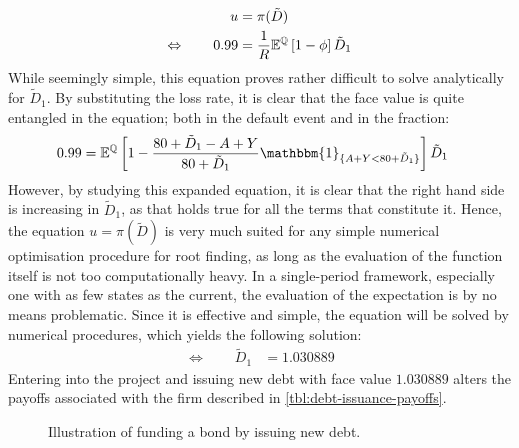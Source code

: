 \documentclass[main.tex]{subfiles}
\begin{document}
            \begin{align*}
                u &= \pi(\tilde{D}) \\
                \Leftrightarrow  \qquad
                \num{0.99} 
                &= 
                    \frac{1}{R}
                    \mathbb{E}^{\mathbb{Q}}\left[
                        1 - \phi
                    \right] 
                    \tilde{D}_{1}
            \end{align*}
        While seemingly simple, this equation proves rather difficult to solve analytically for $\tilde{D}_{1}$.
        By substituting the loss rate, it is clear that the face value is quite entangled in the equation;
        both in the default event and in the fraction:
            \begin{align*}
                \num{0.99}
                &= 
                \mathbb{E}^{\rnmeasure}\left[
                    1 
                    - 
                    \frac{
                        \num{80} + \tilde{D}_{1} - A + Y
                    }{
                        \num{80} + \tilde{D}_{1}
                    }
                    \mathbbm{1}_{\{A + Y < \num{80} + \tilde{D}_{1}\}} 
                \right] 
                \tilde{D}_{1} 
            \end{align*}
        However, by studying this expanded equation, it is clear that the right hand side 
        is increasing in $\tilde{D}_{1}$, as that holds true for all the terms that constitute it.
        Hence, the equation $u = \pi(\tilde{D})$ is very much suited for any simple numerical optimisation procedure
        for root finding, as long as the evaluation of the function itself is not too computationally heavy.
        In a single-period framework, especially one with as few states as the current,
        the evaluation of the expectation is by no means problematic.
        Since it is effective and simple, the equation will be solved by numerical procedures, 
        which yields the following solution:
            \begin{align*}
                \Leftrightarrow  \qquad
                \tilde{D}_{1} &= \num{1.030889}
            \end{align*}
        Entering into the project and issuing new debt with face value $\num{1.030889}$ 
        alters the payoffs associated with the firm described in \cref{tbl:debt-issuance-payoffs}.
        \begin{figure}[t]
            \centering
            \caption{Illustration of funding a bond by issuing new debt.}
            \label{fig:debt-issuance-setup}
        \end{figure}
\end{document}
